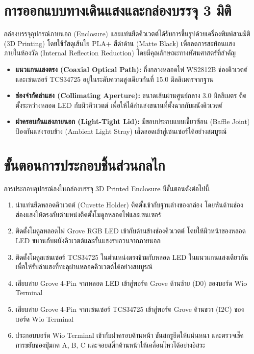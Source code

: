 \section{การออกแบบทางเดินแสงและกล่องบรรจุ 3 มิติ}
กล่องบรรจุอุปกรณ์ภายนอก (Enclosure) และแท่นยึดคิวเวตต์ได้รับการขึ้นรูปด้วยเครื่องพิมพ์สามมิติ (3D Printing) โดยใช้วัสดุเส้นใย PLA+ สีดำด้าน (Matte Black) เพื่อลดการสะท้อนแสงภายในห้องวัด (Internal Reflection Reduction) โดยมีคุณลักษณะทางทัศนศาสตร์ที่สำคัญ
\begin{itemize}[leftmargin=1.5em, itemsep=2pt]
    \item \textbf{แนวแกนแสงตรง (Coaxial Optical Path):} กึ่งกลางหลอดไฟ WS2812B ช่องคิวเวตต์ และเซนเซอร์ TCS34725 อยู่ในระดับความสูงเดียวกันที่ 15.0 มิลลิเมตรจากฐาน
    \item \textbf{ช่องจำกัดลำแสง (Collimating Aperture):} ขนาดเส้นผ่านศูนย์กลาง 3.0 มิลลิเมตร ติดตั้งระหว่างหลอด LED กับผิวคิวเวตต์ เพื่อให้ได้ลำแสงขนานที่ตั้งฉากกับผนังคิวเวตต์
    \item \textbf{ฝาครอบกันแสงภายนอก (Light-Tight Lid):} มีขอบประกบแบบเขี้ยวซ้อน (Baffle Joint) ป้องกันแสงรอบข้าง (Ambient Light Stray) เล็ดลอดเข้าสู่เซนเซอร์ได้อย่างสมบูรณ์
\end{itemize}

\section{ขั้นตอนการประกอบชิ้นส่วนกลไก}
การประกอบอุปกรณ์ลงในกล่องบรรจุ 3D Printed Enclosure มีขั้นตอนดังต่อไปนี้

\begin{enumerate}[leftmargin=1.5em, itemsep=3pt]
    \item นำแท่นยึดหลอดคิวเวตต์ (Cuvette Holder) ติดตั้งเข้ากับฐานล่างของกล่อง โดยหันด้านช่องส่องแสงให้ตรงกับตำแหน่งติดตั้งโมดูลหลอดไฟและเซนเซอร์
    \item ติดตั้งโมดูลหลอดไฟ Grove RGB LED เข้ากับด้านข้างช่องคิวเวตต์ โดยให้ผิวหน้าของหลอด LED ขนานกับผนังคิวเวตต์และกั้นแสงรบกวนจากภายนอก
    \item ติดตั้งโมดูลเซนเซอร์ TCS34725 ในตำแหน่งตรงข้ามกับหลอด LED ในแนวแกนแสงเดียวกัน เพื่อให้รับลำแสงที่ทะลุผ่านหลอดคิวเวตต์ได้อย่างสมบูรณ์
    \item เสียบสาย Grove 4-Pin จากหลอด LED เข้าสู่พอร์ต Grove ด้านซ้าย (D0) ของบอร์ด Wio Terminal
    \item เสียบสาย Grove 4-Pin จากเซนเซอร์ TCS34725 เข้าสู่พอร์ต Grove ด้านขวา (I2C) ของบอร์ด Wio Terminal
    \item ประกอบบอร์ด Wio Terminal เข้ากับฝาครอบด้านหน้า ขันสกรูยึดให้แน่นหนา และตรวจเช็คการขยับของปุ่มกด A, B, C และจอยสติ๊กด้านหน้าให้เคลื่อนไหวได้อย่างอิสระ
\end{enumerate}

